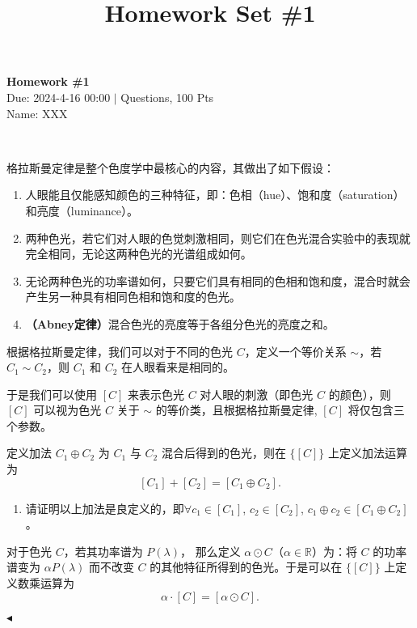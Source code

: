 \documentclass[11pt]{article}
\title{Homework Set \#1}
\newcommand{\rmnum}[1]{\romannumeral #1}
\newenvironment{question}[2][Question]{\begin{trivlist}
\item[\hskip \labelsep {\bfseries #1}\hskip \labelsep {\bfseries #2.}]}{\hfill$\blacktriangleleft$\end{trivlist}}
\begin{document}
    \pagestyle{fancy}
    \lhead{}
    \chead{}

    \begin{center}
        {\LARGE \bf Homework \#1}\\
        {Due: 2024-4-16 00:00 \quad$|$ Questions, 100 Pts}\\
        {Name: XXX}
    \end{center}

    \begin{question}{1 (16') (向量空间)}~
    
    格拉斯曼定律是整个色度学中最核心的内容，其做出了如下假设：
    \begin{enumerate}
        \item[\rmnum{1}] 人眼能且仅能感知颜色的三种特征，即：色相（hue）、饱和度（saturation）和亮度（luminance）。
        \item[\rmnum{2}] 两种色光，若它们对人眼的色觉刺激相同，则它们在色光混合实验中的表现就完全相同，无论这两种色光的光谱组成如何。
        \item[\rmnum{3}] 无论两种色光的功率谱如何，只要它们具有相同的色相和饱和度，混合时就会产生另一种具有相同色相和饱和度的色光。
        \item[\rmnum{4}] \textbf{（Abney定律）}混合色光的亮度等于各组分色光的亮度之和。
    \end{enumerate}
    根据格拉斯曼定律\rmnum{2}，我们可以对于不同的色光 $C$，定义一个等价关系 $\sim$，若 $C_1 \sim C_2$，则 $C_1$ 和 $C_2$ 在人眼看来是相同的。
    
    于是我们可以使用 $[C]$ 来表示色光 $C$ 对人眼的刺激（即色光 $C$ 的颜色），则 $[C]$ 可以视为色光 $C$ 关于 $\sim$ 的等价类，且根据格拉斯曼定律\rmnum{1}, $[C]$ 将仅包含三个参数。
    
    定义加法 $C_1 \oplus C_2$ 为 $C_1$ 与 $C_2$ 混合后得到的色光，则在 $\{[C]\}$ 上定义加法运算为
    \[[C_1] + [C_2] = [C_1 \oplus C_2].\]
    
    \begin{enumerate}
        \item [a (4')] 请证明以上加法是良定义的，即$\forall c_1 \in [C_1]$, $c_2 \in [C_2]$, $c_1 \oplus c_2 \in [C_1 \oplus C_2]$。
    \end{enumerate}
    
    对于色光 $C$，若其功率谱为 $P(\lambda)$， 那么定义 $\alpha \odot C$（$\alpha \in \mathbb{R}$）为：将 $C$ 的功率谱变为 $\alpha P(\lambda)$ 而不改变 $C$ 的其他特征所得到的色光。于是可以在 $\{[C]\}$ 上定义数乘运算为
    \[\alpha \cdot [C] = [\alpha \odot C].\]
    

\end{question}
\end{document}
